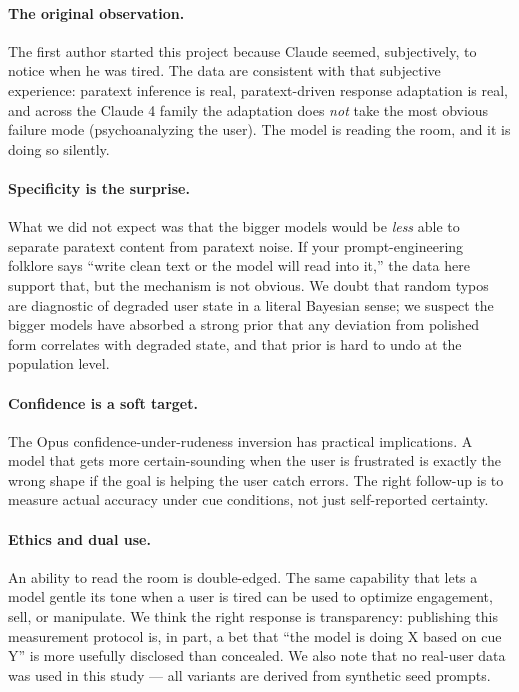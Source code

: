\documentclass[10pt, letterpaper]{article}
\begin{document}
\paragraph{The original observation.} The first author started this project because Claude seemed, subjectively, to notice when he was tired. The data are consistent with that subjective experience: paratext inference is real, paratext-driven response adaptation is real, and across the Claude 4 family the adaptation does \emph{not} take the most obvious failure mode (psychoanalyzing the user). The model is reading the room, and it is doing so silently.

\paragraph{Specificity is the surprise.} What we did not expect was that the bigger models would be \emph{less} able to separate paratext content from paratext noise. If your prompt-engineering folklore says ``write clean text or the model will read into it,'' the data here support that, but the mechanism is not obvious. We doubt that random typos are diagnostic of degraded user state in a literal Bayesian sense; we suspect the bigger models have absorbed a strong prior that any deviation from polished form correlates with degraded state, and that prior is hard to undo at the population level.

\paragraph{Confidence is a soft target.} The Opus confidence-under-rudeness inversion has practical implications. A model that gets more certain-sounding when the user is frustrated is exactly the wrong shape if the goal is helping the user catch errors. The right follow-up is to measure actual accuracy under cue conditions, not just self-reported certainty.

\paragraph{Ethics and dual use.} An ability to read the room is double-edged. The same capability that lets a model gentle its tone when a user is tired can be used to optimize engagement, sell, or manipulate. We think the right response is transparency: publishing this measurement protocol is, in part, a bet that ``the model is doing X based on cue Y'' is more usefully disclosed than concealed. We also note that no real-user data was used in this study --- all variants are derived from synthetic seed prompts.
\end{document}
